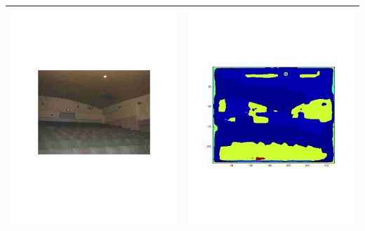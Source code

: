 \documentclass[12pt]{article}
\begin{document}
\begin{longtable}{| c | c |}
  \includegraphics[trim=40mm 40mm 40mm 40mm,clip=true,width=0.45\linewidth]{images/auditorium_1.pdf} & \includegraphics[trim=25mm 25mm 25mm 25mm,clip=true,width=0.45\linewidth]{images/auditorium_2.pdf} \\
  \hline

\end{longtable}
\end{document}
